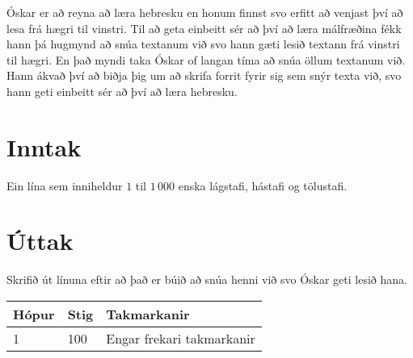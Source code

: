 %
Óskar er að reyna að læra hebresku en honum finnst svo erfitt að venjast því að lesa frá hægri til vinstri.
Til að geta einbeitt sér að því að læra málfræðina fékk hann þá hugmynd að snúa textanum við svo hann gæti lesið textann frá vinstri til hægri.
En það myndi taka Óskar of langan tíma að snúa öllum textanum við.
Hann ákvað því að biðja þig um að skrifa forrit fyrir sig sem snýr texta við, svo hann geti einbeitt sér að því að læra hebresku.

\section*{Inntak}
Ein lína sem inniheldur $1$ til $1\,000$ enska lágstafi, hástafi og tölustafi.

\section*{Úttak}
Skrifið út línuna eftir að það er búið að snúa henni við svo Óskar geti lesið hana.

\begin{tabular}{|l|l|l|}
\hline
Hópur & Stig & Takmarkanir \\ \hline
1     & 100  & Engar frekari takmarkanir \\ \hline
\end{tabular}

